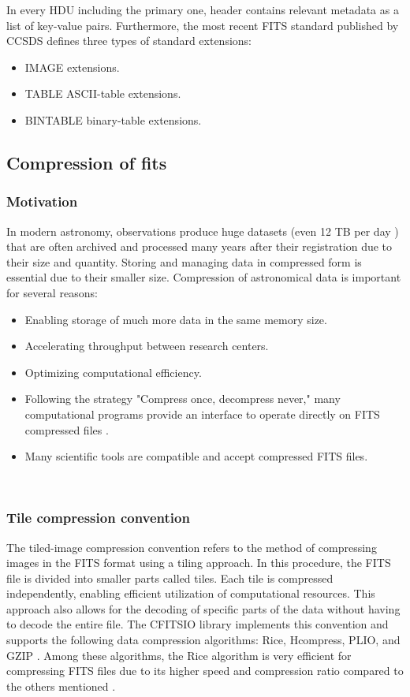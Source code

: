 \documentclass[licencjacka,en]{pracamgr}
\begin{document}
In every HDU including the primary one,  header contains relevant metadata as a list of key-value pairs. \cite{wikipedia} Furthermore, the most recent FITS standard published by CCSDS defines three types of standard extensions:
\begin{itemize}
\item IMAGE extensions.
\item TABLE ASCII-table extensions.
\item BINTABLE binary-table extensions.
\end{itemize}


\subsection{Compression of fits}

\subsubsection{Motivation}
In modern astronomy, observations produce huge datasets (even 12 TB per day \cite{crayondata} ) that are often archived and processed many years after their registration due to their size and quantity. Storing and managing data in compressed form is essential due to their smaller size. Compression of astronomical data is important for several reasons:
\begin{itemize}
\item Enabling storage of much more data in the same memory size.
\item Accelerating throughput between research centers.
\item Optimizing computational efficiency.
\item Following the strategy "Compress once, decompress never," many computational programs provide an interface to operate directly on FITS compressed files \cite{why-rice}. 
\item Many scientific tools are compatible and accept compressed FITS files.
\end{itemize}

\\

\subsubsection{Tile compression convention}

The tiled-image compression convention refers to the method of compressing images in the FITS format using a tiling approach. In this procedure, the FITS file is divided into smaller parts called tiles. Each tile is compressed independently, enabling efficient utilization of computational resources. This approach also allows for the decoding of specific parts of the data without having to decode the entire file. The CFITSIO library implements this convention and supports the following data compression algorithms: Rice, Hcompress, PLIO, and GZIP \cite{rice-comp}. Among these algorithms, the Rice algorithm is very efficient \cite{fpack} for compressing FITS files due to its higher speed and compression ratio compared to the others mentioned \cite{rice-comp}.
\end{document}
